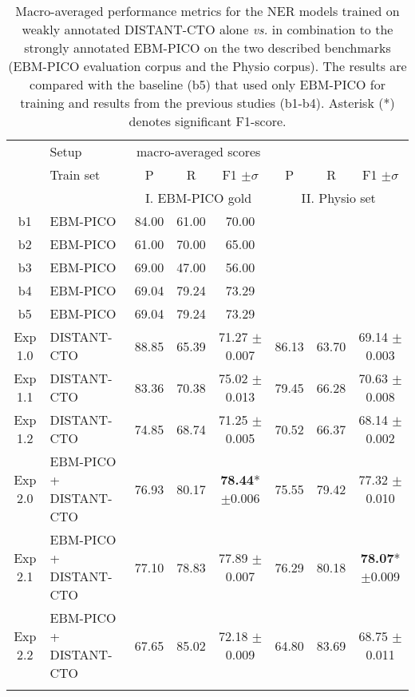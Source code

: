 \documentclass[letterpaper]{article} %
\begin{document}
%
%
%
\setlength{\tabcolsep}{4pt} %
\renewcommand{\arraystretch}{1.0}
\begin{table*}[hbt!]
    \centering
    \begin{tabular}{clccc|ccc}
        \Xhline{1pt}
         & Setup & \multicolumn{3}{c}{macro-averaged scores} \\
        \Xhline{1pt}
         & Train set & P & R & F1 $\pm\sigma$ & P & R & F1 $\pm\sigma$\\
        \hline 
        &  & \multicolumn{3}{c}{I. EBM-PICO gold} & \multicolumn{3}{c}{II. Physio set}  \\
        \hline
        b1 & EBM-PICO & 84.00 & 61.00 & 70.00 &  &  &\\
        b2 & EBM-PICO & 61.00 & 70.00 & 65.00 &  &  &\\
        b3 & EBM-PICO & 69.00 & 47.00 & 56.00 &  &  &\\
        b4 & EBM-PICO & 69.04 & 79.24 & 73.29 &  &  &\\
        b5 & EBM-PICO & 69.04 & 79.24 & 73.29 &  &  &\\
        \hline
        \hline 
        Exp 1.0 & DISTANT-CTO& 88.85 & 65.39 & 71.27 $\pm$0.007 & 86.13 & 63.70 & 69.14 $\pm$0.003\\
        Exp 1.1 & DISTANT-CTO & 83.36 & 70.38 & 75.02 $\pm$0.013 & 79.45 & 66.28 & 70.63 $\pm$0.008\\
        Exp 1.2 & DISTANT-CTO & 74.85 & 68.74 & 71.25 $\pm$0.005 & 70.52 & 66.37 & 68.14 $\pm$0.002 \\
        Exp 2.0 & EBM-PICO + DISTANT-CTO & 76.93  & 80.17  & \textbf{78.44}* $\pm$0.006 & 75.55  & 79.42 & 77.32 $\pm$0.010\\
        Exp 2.1 & EBM-PICO + DISTANT-CTO & 77.10 & 78.83 & 77.89 $\pm$0.007 & 76.29 & 80.18 & \textbf{78.07}* $\pm$0.009\\
        Exp 2.2 & EBM-PICO + DISTANT-CTO & 67.65 & 85.02 & 72.18 $\pm$0.009  & 64.80 & 83.69 & 68.75 $\pm$0.011 \\
        \Xhline{1pt}
    \end{tabular}
    \caption{Macro-averaged performance metrics for the NER models trained on weakly annotated DISTANT-CTO alone \textit{vs.} in combination to the strongly annotated EBM-PICO on the two described benchmarks (EBM-PICO evaluation corpus and the Physio corpus). The results are compared with the baseline (b5) that used only EBM-PICO for training and results from the previous studies (b1-b4). Asterisk (*) denotes significant F1-score.}
    \label{tab:results_modeltraining}
\end{table*}
%
\end{document}
